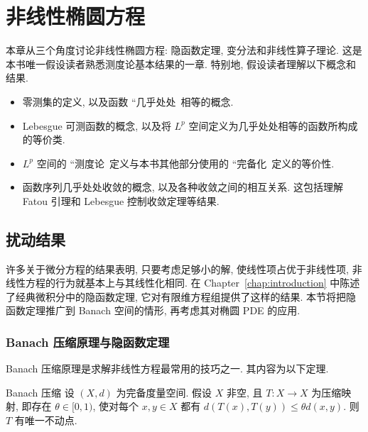 \section{非线性椭圆方程}\label{chap:nonlinear-elliptic-equations}

本章从三个角度讨论非线性椭圆方程: 隐函数定理, 变分法和非线性算子理论. 这是本书唯一假设读者熟悉测度论基本结果的一章. 特别地, 假设读者理解以下概念和结果.\begin{itemize}\item 零测集的定义, 以及函数 ``几乎处处\textquotesingle\textquotesingle\ 相等的概念.\item Lebesgue 可测函数的概念, 以及将 $L^p$ 空间定义为几乎处处相等的函数所构成的等价类.\item $L^p$ 空间的 ``测度论\textquotesingle\textquotesingle\ 定义与本书其他部分使用的 ``完备化\textquotesingle\textquotesingle\ 定义的等价性.\item 函数序列几乎处处收敛的概念, 以及各种收敛之间的相互关系. 这包括理解 Fatou 引理和 Lebesgue 控制收敛定理等结果.\end{itemize}

\subsection{扰动结果}\label{sec:nonlinear-elliptic-perturbation-results}

许多关于微分方程的结果表明, 只要考虑足够小的解, 使线性项占优于非线性项, 非线性方程的行为就基本上与其线性化相同. 在 Chapter~\ref{chap:introduction} 中陈述了经典微积分中的隐函数定理, 它对有限维方程组提供了这样的结果. 本节将把隐函数定理推广到 Banach 空间的情形, 再考虑其对椭圆 PDE 的应用.

\subsubsection{Banach 压缩原理与隐函数定理}\label{subsec:banach-contraction-implicit-function}

Banach 压缩原理是求解非线性方程最常用的技巧之一. 其内容为以下定理.

\begin{Theorem}{Banach 压缩}
\label{thm:banach-contraction-fixed-point}
设 $(X,d)$ 为完备度量空间. 假设 $X$ 非空, 且 $T:X\to X$ 为压缩映射, 即存在 $\theta\in[0,1)$, 使对每个 $x,y\in X$ 都有 $d(T(x),T(y))\leq\theta d(x,y)$. 则 $T$ 有唯一不动点.
\end{Theorem}

